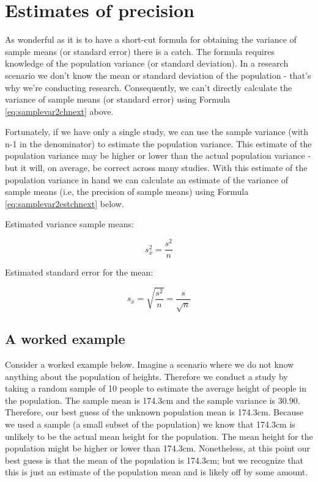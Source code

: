 \documentclass[
]{krantz}
\begin{document}
\hypertarget{estimates-of-precision}{%
\section{Estimates of precision}\label{estimates-of-precision}}

As wonderful as it is to have a short-cut formula for obtaining the variance of sample means (or standard error) there is a catch. The formula requires knowledge of the population variance (or standard deviation). In a research scenario we don't know the mean or standard deviation of the population - that's why we're conducting research. Consequently, we can't directly calculate the variance of sample means (or standard error) using Formula \eqref{eq:samplevar2chnext} above.

Fortunately, if we have only a single study, we can use the sample variance (with n-1 in the denominator) to estimate the population variance. This estimate of the population variance may be higher or lower than the actual population variance - but it will, on average, be correct across many studies. With this estimate of the population variance in hand we can calculate an estimate of the variance of sample means (i.e, the precision of sample means) using Formula \eqref{eq:samplevar2estchnext} below.

Estimated variance sample means:

\begin{equation} 
s_{\bar{x}}^2 = \frac{s^2}{n}
      \label{eq:samplevar2estchnext}
\end{equation}

Estimated standard error for the mean:

\begin{equation} 
s_{\bar{x}} = \sqrt{\frac{s^2}{n}} = \frac{s}{{\sqrt{n}}}
      \label{eq:samplese2estchnext}
\end{equation}

\hypertarget{a-worked-example}{%
\subsection{A worked example}\label{a-worked-example}}

Consider a worked example below. Imagine a scenario where we do not know anything about the population of heights. Therefore we conduct a study by taking a random sample of 10 people to estimate the average height of people in the population. The sample mean is 174.3cm and the sample variance is 30.90. Therefore, our best guess of the unknown population mean is 174.3cm. Because we used a sample (a small subset of the population) we know that 174.3cm is unlikely to be the actual mean height for the population. The mean height for the population might be higher or lower than 174.3cm. Nonetheless, at this point our best guess is that the mean of the population is 174.3cm; but we recognize that this is just an estimate of the population mean and is likely off by some amount.
\end{document}
